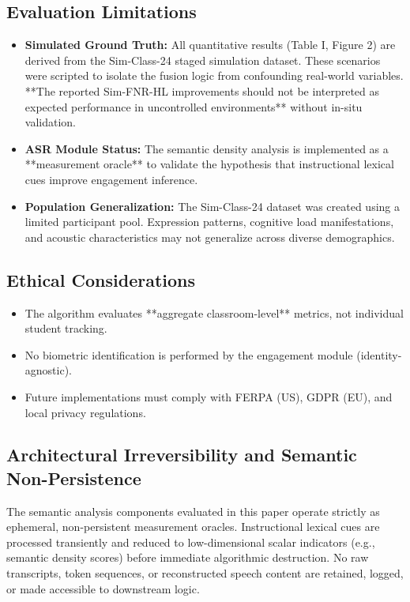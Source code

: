 \documentclass[conference]{IEEEtran}
\begin{document}
\subsection{Evaluation Limitations}
\begin{itemize}
    \item \textbf{Simulated Ground Truth:} All quantitative results (Table I, Figure 2) are derived from the Sim-Class-24 staged simulation dataset. These scenarios were scripted to isolate the fusion logic from confounding real-world variables. **The reported Sim-FNR-HL improvements should not be interpreted as expected performance in uncontrolled environments** without in-situ validation.
    \item \textbf{ASR Module Status:} The semantic density analysis is implemented as a **measurement oracle** to validate the hypothesis that instructional lexical cues improve engagement inference. 
    \item \textbf{Population Generalization:} The Sim-Class-24 dataset was created using a limited participant pool. Expression patterns, cognitive load manifestations, and acoustic characteristics may not generalize across diverse demographics.
\end{itemize}

\subsection{Ethical Considerations}
\begin{itemize}
    \item The algorithm evaluates **aggregate classroom-level** metrics, not individual student tracking.
    \item No biometric identification is performed by the engagement module (identity-agnostic).
    \item Future implementations must comply with FERPA (US), GDPR (EU), and local privacy regulations.
\end{itemize}

\subsection{Architectural Irreversibility and Semantic Non-Persistence}
The semantic analysis components evaluated in this paper operate strictly as ephemeral, non-persistent measurement oracles. Instructional lexical cues are processed transiently and reduced to low-dimensional scalar indicators (e.g., semantic density scores) before immediate algorithmic destruction. No raw transcripts, token sequences, or reconstructed speech content are retained, logged, or made accessible to downstream logic.
\end{document}
